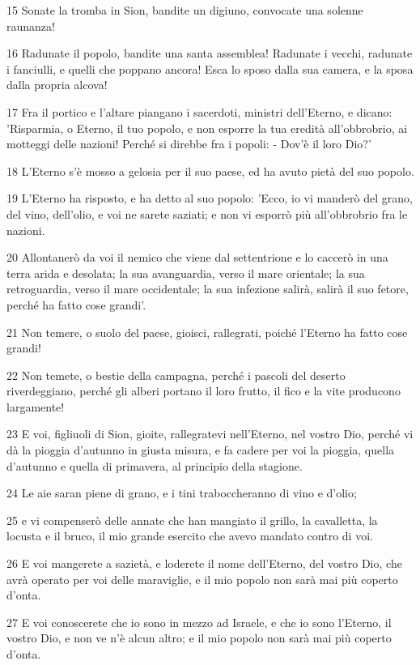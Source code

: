 \par 15 Sonate la tromba in Sion, bandite un digiuno, convocate una solenne raunanza!
\par 16 Radunate il popolo, bandite una santa assemblea! Radunate i vecchi, radunate i fanciulli, e quelli che poppano ancora! Esca lo sposo dalla sua camera, e la sposa dalla propria alcova!
\par 17 Fra il portico e l'altare piangano i sacerdoti, ministri dell'Eterno, e dicano: 'Risparmia, o Eterno, il tuo popolo, e non esporre la tua eredità all'obbrobrio, ai motteggi delle nazioni! Perché si direbbe fra i popoli: - Dov'è il loro Dio?'
\par 18 L'Eterno s'è mosso a gelosia per il suo paese, ed ha avuto pietà del suo popolo.
\par 19 L'Eterno ha risposto, e ha detto al suo popolo: 'Ecco, io vi manderò del grano, del vino, dell'olio, e voi ne sarete saziati; e non vi esporrò più all'obbrobrio fra le nazioni.
\par 20 Allontanerò da voi il nemico che viene dal settentrione e lo caccerò in una terra arida e desolata; la sua avanguardia, verso il mare orientale; la sua retroguardia, verso il mare occidentale; la sua infezione salirà, salirà il suo fetore, perché ha fatto cose grandi'.
\par 21 Non temere, o suolo del paese, gioisci, rallegrati, poiché l'Eterno ha fatto cose grandi!
\par 22 Non temete, o bestie della campagna, perché i pascoli del deserto riverdeggiano, perché gli alberi portano il loro frutto, il fico e la vite producono largamente!
\par 23 E voi, figliuoli di Sion, gioite, rallegratevi nell'Eterno, nel vostro Dio, perché vi dà la pioggia d'autunno in giusta misura, e fa cadere per voi la pioggia, quella d'autunno e quella di primavera, al principio della stagione.
\par 24 Le aie saran piene di grano, e i tini traboccheranno di vino e d'olio;
\par 25 e vi compenserò delle annate che han mangiato il grillo, la cavalletta, la locusta e il bruco, il mio grande esercito che avevo mandato contro di voi.
\par 26 E voi mangerete a sazietà, e loderete il nome dell'Eterno, del vostro Dio, che avrà operato per voi delle maraviglie, e il mio popolo non sarà mai più coperto d'onta.
\par 27 E voi conoscerete che io sono in mezzo ad Israele, e che io sono l'Eterno, il vostro Dio, e non ve n'è alcun altro; e il mio popolo non sarà mai più coperto d'onta.
